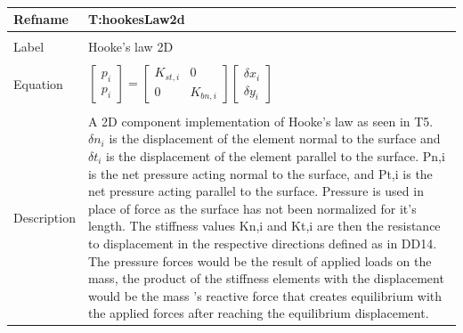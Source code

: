 \documentclass[12pt]{article}
\begin{document}
~\newline
\noindent \begin{minipage}{\textwidth}
\begin{tabular}{p{} p{}}
\toprule \textbf{Refname} & \textbf{T:hookesLaw2d}
\label{T:hookesLaw2d}
\\ \midrule \\
Label & Hooke's law 2D
\\ \midrule \\
Equation & $\begin{bmatrix}
p_{i}\\
p_{i}
\end{bmatrix}=\begin{bmatrix}
K_{st,i} & 0\\
0 & K_{bn,i}
\end{bmatrix}\begin{bmatrix}
\delta{}x_{i}\\
\delta{}y_{i}
\end{bmatrix}$
\\ \midrule \\
Description & A 2D component implementation of Hooke's law as seen in T5. $\delta{}n_{i}$ is the displacement of the element normal to the surface and $\delta{}t_{i}$ is the displacement of the element parallel to the surface. Pn,i is the net pressure acting normal to the surface, and Pt,i is the net pressure acting parallel to the surface. Pressure is used in place of force as the surface has not been normalized for it's length. The stiffness values Kn,i and Kt,i are then the resistance to displacement in the respective directions defined as in DD14. The pressure forces would be the result of applied loads on the mass, the product of the stiffness elements with the displacement would be the mass 's reactive force that creates equilibrium with the applied forces after reaching the equilibrium displacement.
\\ \bottomrule \end{tabular}
\end{minipage}\\
~\newline
\end{document}
